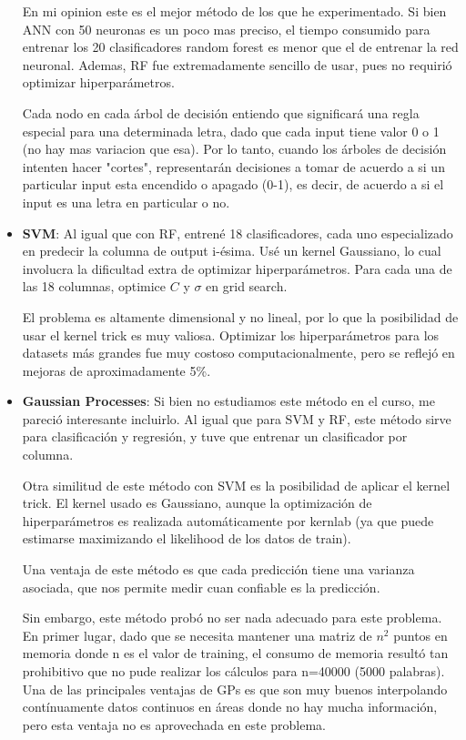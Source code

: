 \documentclass[paper=a4, fontsize=11pt]{scrartcl} %
\numberwithin{equation}{section} %
\numberwithin{figure}{section} %
\numberwithin{table}{section} %
\begin{document}
\begin{itemize}
En mi opinion este es el mejor método de los que he experimentado. Si bien ANN con 50 neuronas es un poco mas preciso, el tiempo consumido para entrenar los 20 clasificadores random forest es menor que el de entrenar la red neuronal. Ademas, RF fue extremadamente sencillo de usar, pues no requirió optimizar hiperparámetros.

Cada nodo en cada árbol de decisión entiendo que significará una regla especial para una determinada letra, dado que cada input tiene valor 0 o 1 (no hay mas variacion que esa). Por lo tanto, cuando los árboles de decisión intenten hacer "cortes", representarán decisiones a tomar de acuerdo a si un particular input esta encendido o apagado (0-1), es decir, de acuerdo a si el input es una letra en particular o no.

\item \textbf{SVM}: Al igual que con RF, entrené 18 clasificadores, cada uno especializado en predecir la columna de output i-ésima. Usé un kernel Gaussiano, lo cual involucra la dificultad extra de optimizar hiperparámetros. Para cada una de las 18 columnas, optimice $C$ y $\sigma$ en grid search.

El problema es altamente dimensional y no lineal, por lo que la posibilidad de usar el kernel trick es muy valiosa. Optimizar los hiperparámetros para los datasets más grandes fue muy costoso computacionalmente, pero se reflejó en mejoras de aproximadamente 5\%.

\item \textbf{Gaussian Processes}: Si bien no estudiamos este método en el curso, me pareció interesante incluirlo\cite{gauss_processes}. Al igual que para SVM y RF, este método sirve para clasificación y regresión, y tuve que entrenar un clasificador por columna. 

Otra similitud de este método con SVM es la posibilidad de aplicar el kernel trick. El kernel usado es Gaussiano, aunque la optimización de hiperparámetros es realizada automáticamente por kernlab (ya que puede estimarse maximizando el likelihood de los datos de train).

Una ventaja de este método es que cada predicción tiene una varianza asociada, que nos permite medir cuan confiable es la predicción.

Sin embargo, este método probó no ser nada adecuado para este problema. En primer lugar, dado que se necesita mantener una matriz de $n^2$ puntos en memoria donde n es el valor de training, el consumo de memoria resultó tan prohibitivo que no pude realizar los cálculos para n=40000 (5000 palabras). Una de las principales ventajas de GPs es que son muy buenos interpolando contínuamente datos continuos en áreas donde no hay mucha información, pero esta ventaja no es aprovechada en este problema.


\end{itemize}
\end{document}
